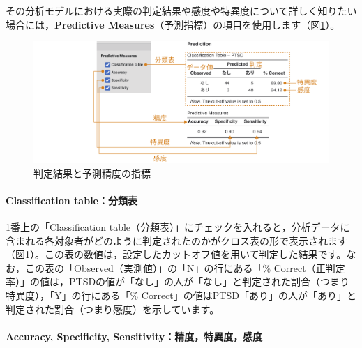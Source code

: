 \documentclass[
  12pt,
  a5jpaper,
  lualatex, ja=standard]{bxjsbook}
\begin{document}
その分析モデルにおける実際の判定結果や感度や特異度について詳しく知りたい場合には，\textbf{Predictive Measures}（予測指標）の項目を使用します（図\ref{fig:regression-binomial-predictive}）。

\begin{figure}[!ht]

{\centering \includegraphics[width=1\linewidth]{images/regression/binomial-predictive} 

}

\caption{判定結果と予測精度の指標}\label{fig:regression-binomial-predictive}
\end{figure}

\hypertarget{classification-tableux5206ux985eux8868}{%
\paragraph*{Classification table：分類表}\label{classification-tableux5206ux985eux8868}}

1番上の「Classification table（分類表）」にチェックを入れると，分析データに含まれる各対象者がどのように判定されたのかがクロス表の形で表示されます（図\ref{fig:regression-binomial-predictive}）。この表の数値は，設定したカットオフ値を用いて判定した結果です。なお，この表の「Observed（実測値）」の「N」の行にある「\% Correct（正判定率）」の値は，PTSDの値が「なし」の人が「なし」と判定された割合（つまり特異度），「Y」の行にある「\% Correct」の値はPTSD「あり」の人が「あり」と判定された割合（つまり感度）を示しています。

\hypertarget{accuracy-specificity-sensitivityux7cbeux5ea6ux7279ux7570ux5ea6ux611fux5ea6}{%
\paragraph*{Accuracy, Specificity, Sensitivity：精度，特異度，感度}\label{accuracy-specificity-sensitivityux7cbeux5ea6ux7279ux7570ux5ea6ux611fux5ea6}}
\end{document}
